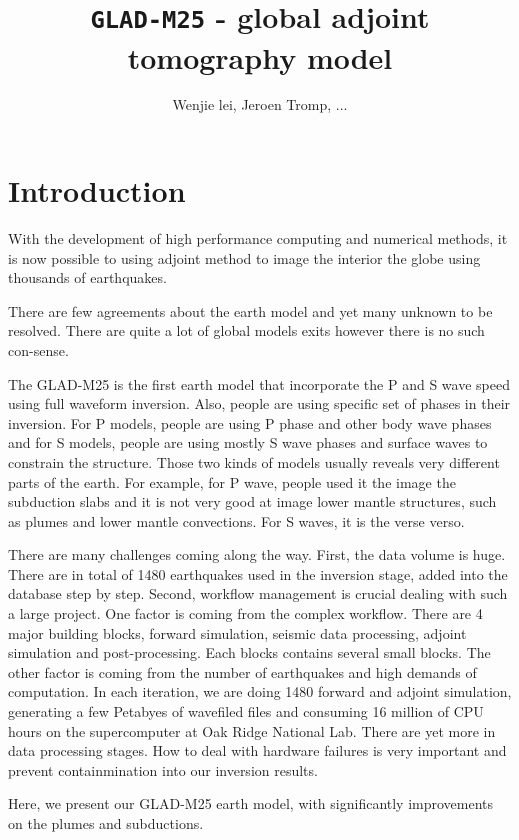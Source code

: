 \documentclass[extra,mreferee]{gji}
\title[\texttt{gji\_extra.sty} ]  
  {\texttt{GLAD-M25} - global adjoint tomography model}
\author[]  {Wenjie lei, Jeroen Tromp, ...}
\begin{document}
\maketitle

\section{Introduction}
With the development of high performance computing and numerical methods, it is now possible to using adjoint method to image the interior the globe using thousands of earthquakes. 

There are few agreements about the earth model and yet many unknown to be resolved. There are quite a lot of global models exits however there is no such con-sense. 

The GLAD-M25 is the first earth model that incorporate the P and S wave speed using full waveform inversion. Also, people are using specific set of phases in their inversion. For P models, people are using P phase and other body wave phases and for S models, people are using mostly S wave phases and surface waves to constrain the structure. Those two kinds of models usually reveals very different parts of the earth. For example, for P wave, people used it the image the subduction slabs and it is not very good at image lower mantle structures, such as plumes and lower mantle convections. For S waves, it is the verse verso.

There are many challenges coming along the way. First, the data volume is huge.  There are in total of 1480 earthquakes used in the inversion stage, added into the database step by step. Second, workflow management is crucial dealing with such a large project. One factor is coming from the complex workflow. There are 4 major building blocks, forward simulation, seismic data processing, adjoint simulation and post-processing. Each blocks contains several small blocks. The other factor is coming from the number of earthquakes and high demands of computation. In each iteration, we are doing 1480 forward and adjoint simulation, generating a few Petabyes of wavefiled files and consuming 16 million of CPU hours on the supercomputer at Oak Ridge National Lab. There are yet more in data processing stages. How to deal with hardware failures is very important and prevent containmination into our inversion results.

Here, we present our GLAD-M25 earth model, with significantly improvements on the plumes and subductions.
\end{document}

